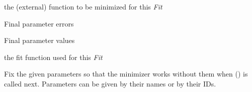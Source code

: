 \documentclass[a4paper,10pt,english]{sphinxmanual}
\begin{document}
\begin{fulllineitems}
\begin{fulllineitems}
\begin{quote}
\begin{description}
\begin{itemize}
\end{itemize}

\end{description}\end{quote}

\end{fulllineitems}


\begin{fulllineitems}
\label{index:kafe.fit.Fit.external_fcn}
the (external) function to be minimized for this \emph{Fit}

\end{fulllineitems}


\begin{fulllineitems}
\label{index:kafe.fit.Fit.final_parameter_errors}
Final parameter errors

\end{fulllineitems}


\begin{fulllineitems}
\label{index:kafe.fit.Fit.final_parameter_values}
Final parameter values

\end{fulllineitems}


\begin{fulllineitems}
\label{index:kafe.fit.Fit.fit_function}
the fit function used for this \emph{Fit}

\end{fulllineitems}


\begin{fulllineitems}
\label{index:kafe.fit.Fit.fix_parameters}
Fix the given parameters so that the minimizer works without them
when {\hyperref[index:kafe.fit.Fit.do_fit]{\emph{}}} () is called next. Parameters can be
given by their names or by their IDs.


\end{fulllineitems}
\end{fulllineitems}
\end{document}
